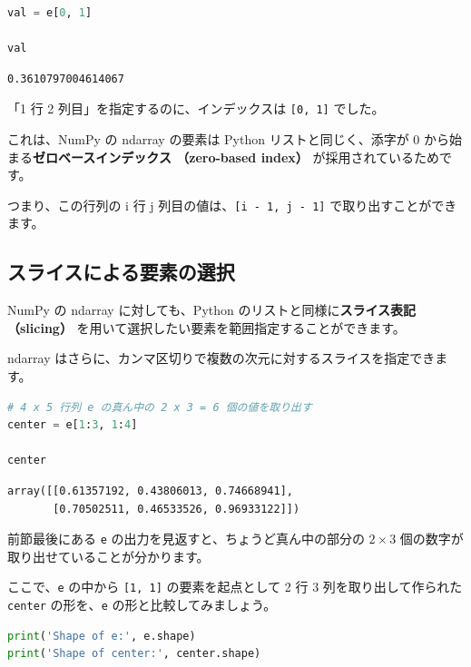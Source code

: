 \begin{lstlisting}[style=codecell,language=Python]
val = e[0, 1]

val
\end{lstlisting}

\begin{lstlisting}[style=outputcell]
0.3610797004614067
\end{lstlisting}

「1 行 2 列目」を指定するのに、インデックスは \texttt{[0, 1]} でした。

これは、NumPy の ndarray の要素は Python リストと同じく、添字が 0 から始まる\textbf{ゼロベースインデックス （zero-based index）} が採用されているためです。

つまり、この行列の i 行 j 列目の値は、\texttt{[i - 1, j - 1]} で取り出すことができます。


\subsection{スライスによる要素の選択}


NumPy の ndarray に対しても、Python のリストと同様に\textbf{スライス表記 （slicing）} を用いて選択したい要素を範囲指定することができます。

ndarray はさらに、カンマ区切りで複数の次元に対するスライスを指定できます。


\begin{lstlisting}[style=codecell,language=Python]
# 4 x 5 行列 e の真ん中の 2 x 3 = 6 個の値を取り出す
center = e[1:3, 1:4]

center
\end{lstlisting}

\begin{lstlisting}[style=outputcell]
array([[0.61357192, 0.43806013, 0.74668941],
       [0.70502511, 0.46533526, 0.96933122]])
\end{lstlisting}

前節最後にある \texttt{e} の出力を見返すと、ちょうど真ん中の部分の $2 \times 3$ 個の数字が取り出せていることが分かります。

ここで、\texttt{e} の中から \texttt{[1, 1]} の要素を起点として 2 行 3 列を取り出して作られた \texttt{center} の形を、\texttt{e} の形と比較してみましょう。


\begin{lstlisting}[style=codecell,language=Python]
print('Shape of e:', e.shape)
print('Shape of center:', center.shape)
\end{lstlisting}

